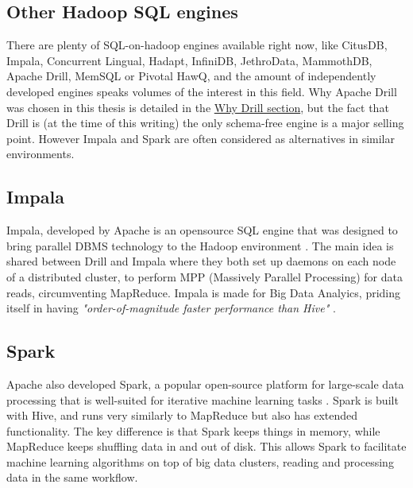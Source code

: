 \documentclass[a4paper,english]{report}
\begin{document}
		\subsection{Other Hadoop SQL engines}
		There are plenty of SQL-on-hadoop engines available right now, like CitusDB, Impala, Concurrent Lingual, Hadapt, InfiniDB, JethroData, MammothDB, Apache Drill, MemSQL or Pivotal HawQ, and the amount of independently developed engines speaks volumes of the interest in this field. Why Apache Drill was chosen in this thesis is detailed in the \hyperref[sec:why_drill]{Why Drill section}, but the fact that Drill is (at the time of this writing) the only schema-free engine is a major selling point. However Impala and Spark are often considered as alternatives in similar environments.
			\subsection{Impala}
			Impala, developed by Apache is an opensource SQL engine that was designed to bring parallel DBMS technology to the Hadoop environment \cite{impala}. The main idea is shared between Drill and Impala where they both set up daemons on each node of a distributed cluster, to perform MPP (Massively Parallel Processing) for data reads, circumventing MapReduce. Impala is made for Big Data Analyics, priding itself in having \textit{"order-of-magnitude faster performance than Hive"} \cite{impalasite}.
			\subsection{Spark}
			Apache also developed Spark, a popular open-source platform for large-scale data processing that is	well-suited for iterative machine learning tasks \cite{spark_ml}. Spark is built with Hive, and runs very similarly to MapReduce but also has extended functionality. The key difference is that Spark keeps things in memory, while MapReduce keeps shuffling data in and out of disk. This allows Spark to facilitate machine learning algorithms on top of big data clusters, reading and processing data in the same workflow.
			
\end{document}

